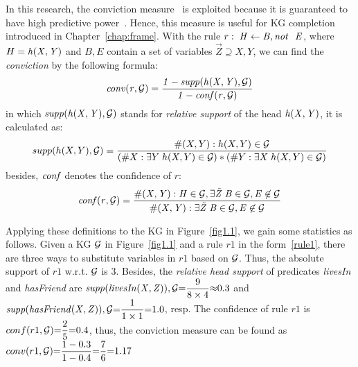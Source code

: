 In this research, the conviction measure~\cite{ref48} is exploited because it is guaranteed to have high predictive power~\cite{ref46}. Hence, this measure is useful for KG completion introduced in Chapter~\ref{chap:frame}. With the rule $r:\;\mathit{H\leftarrow B, \mathit{not}~ \ E}$, where $H=\mathit{h(X,Y)}$ and $B,E$ contain a set of variables $\vec{Z}\supseteq X,Y$, we can find the \emph{conviction} by the following formula:
\vspace{-.26cm}
\begin{equation}
\mathit{conv(r, \mathcal{G})= \dfrac{1 - supp(h(X,Y), \mathcal{G})}{1 - conf(r, \mathcal{G})}}
\end{equation}
in which $\mathit{supp(h(X,Y),\mathcal{G})}$ stands for \textit{relative support} of the head $\mathit{h(X,Y)}$, it is calculated as:
\vspace{-.28cm}
\begin{equation}
supp(h(X,Y),\mathcal{G})=\dfrac{\#(X,Y):h(X,Y)\in \mathcal{G}}{(\#X:\exists Y\;h(X,Y)\in \mathcal{G})*(\#Y:\exists X\;h(X,Y)\in \mathcal{G})}
\end{equation}
besides, $\mathit{conf}$ denotes the confidence of $r$:
\begin{equation}
\mathit{conf(r,\mathcal{G})=\dfrac{\#(X,Y): H \in \mathcal{G}, \exists \vec{Z}\;B\in \mathcal{G},E \not \in \mathcal{G}}{\#(X,Y):\exists \vec{Z}\; B\in \mathcal{G}, E \not \in \mathcal{G}}}
\end{equation}
\vspace{-.3cm}

\begin{example}
Applying these definitions to the KG in Figure~\ref{fig1.1}, we gain some statistics as follows. Given a KG $\mathcal{G}$ in Figure~\ref{fig1.1} and a rule $r1$ in the form~\ref{rule1}, there are three ways to substitute variables in $r1$ based on $\mathcal{G}$. Thus, the absolute support of $r1$ w.r.t. $\mathcal{G}$ is $3$. Besides, the \textit{relative head support} of predicates \textit{livesIn} and \textit{hasFriend} are $\mathit{supp(livesIn(X,Z)), \mathcal{G}}{=}\dfrac{9}{8 \times 4}{\approx} 0.3$ and  $\mathit{supp(hasFriend(X,Z)), \mathcal{G}}{=}\dfrac{1}{1 \times 1}{=} 1.0$, resp. The confidence of rule $r1$ is $conf(r1, \mathcal{G}) {=} \dfrac{2}{5} {=} 0.4$, thus, the conviction measure can be found as $conv(r1, \mathcal{G}) {=} \dfrac{1-0.3}{1 - 0.4} {=} \dfrac{7}{6} {=} 1.17$
\end{example}